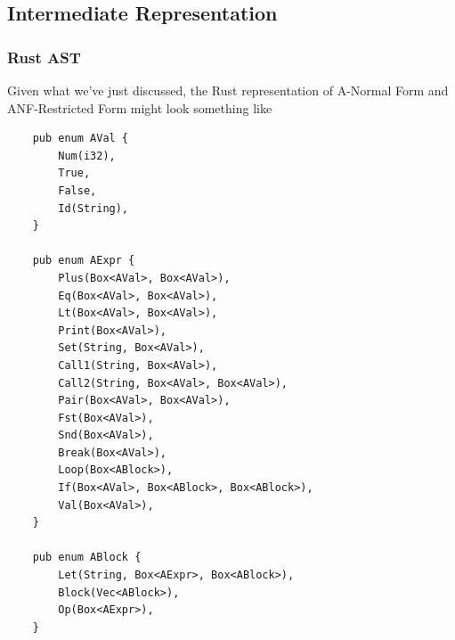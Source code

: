\subsection{Intermediate Representation}
\subsubsection{Rust AST}
Given what we've just discussed, the Rust representation of A-Normal Form and ANF-Restricted Form might look something like 
\begin{verbatim}
    pub enum AVal {
        Num(i32),
        True,
        False,
        Id(String),
    }

    pub enum AExpr {
        Plus(Box<AVal>, Box<AVal>),
        Eq(Box<AVal>, Box<AVal>),
        Lt(Box<AVal>, Box<AVal>),
        Print(Box<AVal>),
        Set(String, Box<AVal>),
        Call1(String, Box<AVal>),
        Call2(String, Box<AVal>, Box<AVal>),
        Pair(Box<AVal>, Box<AVal>),
        Fst(Box<AVal>),
        Snd(Box<AVal>),
        Break(Box<AVal>),
        Loop(Box<ABlock>),
        If(Box<AVal>, Box<ABlock>, Box<ABlock>),
        Val(Box<AVal>),
    }

    pub enum ABlock {
        Let(String, Box<AExpr>, Box<ABlock>),
        Block(Vec<ABlock>),
        Op(Box<AExpr>),
    }\end{verbatim}

